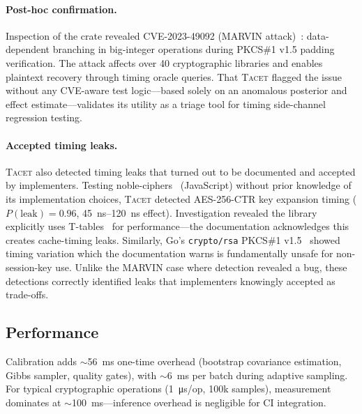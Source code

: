 \documentclass[letterpaper,twocolumn,10pt]{article}
\newcommand{\tacet}{\textsc{Tacet}\xspace}
\newcommand{\us}[1]{\SI{#1}{\micro\second}}
\newcommand{\ms}[1]{\SI{#1}{\milli\second}}
\begin{document}
\paragraph{Post-hoc confirmation.}
Inspection of the crate revealed CVE-2023-49092 (MARVIN
attack)~\cite{marvin}: data-dependent branching in big-integer operations
during PKCS\#1 v1.5 padding verification. The attack affects over 40
cryptographic libraries and enables plaintext recovery through timing
oracle queries. That \tacet flagged the issue without any CVE-aware test
logic---based solely on an anomalous posterior and effect estimate---validates
its utility as a triage tool for timing side-channel regression testing.

\paragraph{Accepted timing leaks.}
\tacet also detected timing leaks that turned out to be documented and accepted by
implementers. Testing noble-ciphers~\cite{noble} (JavaScript) without prior
knowledge of its implementation choices, \tacet detected AES-256-CTR key expansion
timing ($P(\text{leak})=0.96$, \SIrange{45}{120}{\nano\second} effect). Investigation revealed the library
explicitly uses T-tables~\cite{bernstein2005cache} for performance—the documentation
acknowledges this creates cache-timing leaks. Similarly, Go's \texttt{crypto/rsa}
PKCS\#1 v1.5~\cite{go-rsa-docs} showed timing variation which the documentation warns
is fundamentally unsafe for non-session-key use. Unlike the MARVIN case where detection
revealed a bug, these detections correctly identified leaks that implementers knowingly
accepted as trade-offs.

\subsection{Performance}
\label{sec:evaluation:performance}

Calibration adds $\sim$\ms{56} one-time overhead (bootstrap covariance estimation,
Gibbs sampler, quality gates), with $\sim$\ms{6} per batch during adaptive sampling.
For typical cryptographic operations (\us{1}/op, 100k samples), measurement
dominates at $\sim$\ms{100}—inference overhead is negligible for CI integration.

\end{document}
